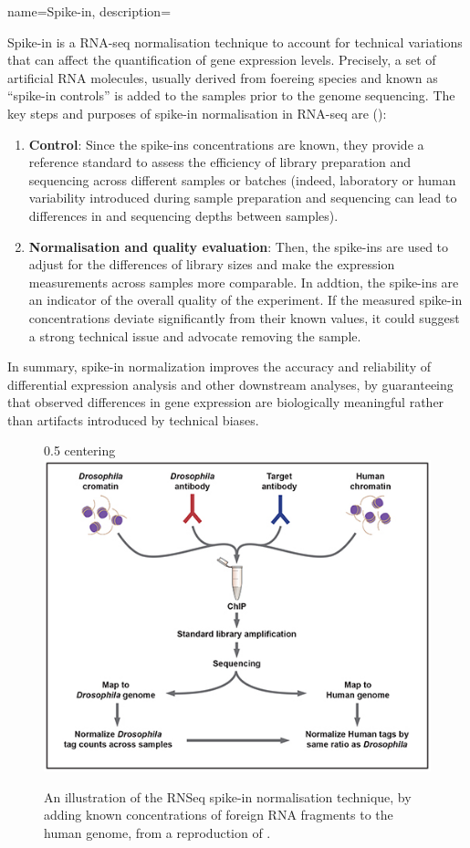 {name=Spike-in, 
description={Spike-in is a RNA-seq normalisation technique to account for technical variations 
that can affect the quantification of gene expression levels. Precisely, a set of artificial RNA molecules,
usually derived from foereing species and known as \enquote{spike-in controls} is added to the samples prior to the genome sequencing. 
The key steps and purposes of spike-in normalisation in RNA-seq are ():
\begin{enumerate}
\item \textbf{Control}: Since the spike-ins concentrations are known, they provide a reference standard
 to assess the efficiency of library preparation and sequencing across different samples or batches (indeed,
 laboratory or human variability introduced during sample preparation and sequencing can lead to differences in
 and sequencing depths between samples).
\item \textbf{Normalisation and quality evaluation}: Then, the spike-ins are used to adjust for the differences of library sizes and make
 the expression measurements across samples more comparable. 
 In addtion, the spike-ins are an indicator of the overall quality of the experiment.
 If the measured spike-in concentrations deviate significantly from their known values,
 it could suggest a strong technical issue and advocate removing the sample.
\end{enumerate}
In summary, spike-in normalization improves the accuracy  and reliability of
 differential expression analysis and other downstream analyses, by guaranteeing that observed differences
 in gene expression are biologically meaningful rather than artifacts introduced by technical biases. 
  \begin{figure}[h]{0.5\textwidth}
 centering
\includegraphics{figures/biological_introduction/spike-ins-normalisation.jpeg} 
\caption[\textbf{Spike-In Normalisation}]{An illustration of the RNSeq spike-in normalisation technique, by adding known concentrations
 of foreign RNA fragments to the human genome, from a reproduction of \autocite{writer16}.}
\label{fig:spike-ins}
\end{figure}
}}

